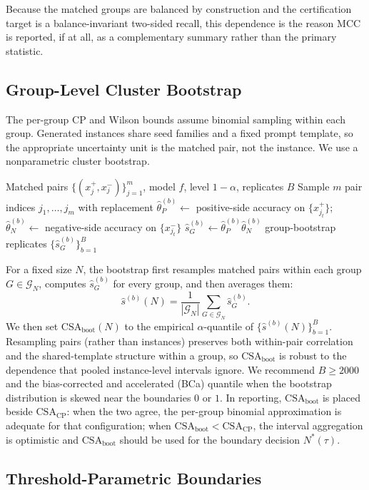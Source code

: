 \documentclass[10pt,conference]{IEEEtran}
\theoremstyle{remark}
\newcommand{\CSACP}{\mathrm{CSA}_{\mathrm{CP}}}
\newcommand{\CSAboot}{\mathrm{CSA}_{\mathrm{boot}}}
\begin{document}
Because the matched groups are balanced by construction and the certification target is a balance-invariant two-sided recall, this dependence is the reason MCC is reported, if at all, as a complementary summary rather than the primary statistic.

\subsection{Group-Level Cluster Bootstrap}
\label{sec:supp-bootstrap}

The per-group CP and Wilson bounds assume binomial sampling within each group.  Generated instances share seed families and a fixed prompt template, so the appropriate uncertainty unit is the matched pair, not the instance.  We use a nonparametric cluster bootstrap.

\begin{algorithmic}[1]
\Require Matched pairs $\{(x_j^+,x_j^-)\}_{j=1}^m$, model $f$, level $1-\alpha$, replicates $B$
  \State Sample $m$ pair indices $j_1,\ldots,j_m$ with replacement
  \State $\hat\theta_P^{(b)}\gets$ positive-side accuracy on $\{x_{j_t}^+\}$; $\hat\theta_N^{(b)}\gets$ negative-side accuracy on $\{x_{j_t}^-\}$
  \State $\hat s_G^{(b)}\gets \hat\theta_P^{(b)}\hat\theta_N^{(b)}$
\EndFor
\State \Return group-bootstrap replicates $\{\hat s_G^{(b)}\}_{b=1}^{B}$
\end{algorithmic}

For a fixed size $N$, the bootstrap first resamples matched pairs within each group $G\in\mathcal{G}_N$, computes $\hat s_G^{(b)}$ for every group, and then averages them:
\[
\hat s^{(b)}(N)=\frac{1}{|\mathcal{G}_N|}\sum_{G\in\mathcal{G}_N}\hat s_G^{(b)}.
\]
We then set $\CSAboot(N)$ to the empirical $\alpha$-quantile of $\{\hat s^{(b)}(N)\}_{b=1}^{B}$.  Resampling pairs (rather than instances) preserves both within-pair correlation and the shared-template structure within a group, so $\CSAboot$ is robust to the dependence that pooled instance-level intervals ignore.  We recommend $B\ge 2000$ and the bias-corrected and accelerated (BCa) quantile when the bootstrap distribution is skewed near the boundaries $0$ or $1$.  In reporting, $\CSAboot$ is placed beside $\CSACP$: when the two agree, the per-group binomial approximation is adequate for that configuration; when $\CSAboot<\CSACP$, the interval aggregation is optimistic and $\CSAboot$ should be used for the boundary decision $N^*(\tau)$.

\subsection{Threshold-Parametric Boundaries}
\end{document}
